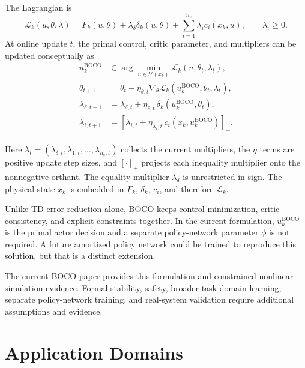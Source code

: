 \documentclass[a4paper]{article}
\begin{document}
The Lagrangian is
\begin{equation}
  \mathcal L_k(u,\theta,\lambda)
  =
  F_k(u,\theta)
  +
  \lambda_\delta\delta_k(u,\theta)
  +
  \sum_{i=1}^{n_c}\lambda_i c_i(x_k,u),
  \qquad
  \lambda_i\ge 0.
\end{equation}
At online update $t$, the primal control, critic parameter, and multipliers
can be updated conceptually as
\begin{equation}
  \begin{aligned}
    u_k^{\mathrm{BOCO}}
    &\in
    \arg\min_{u\in\mathcal U(x_k)}
    \mathcal L_k(u,\theta_t,\lambda_t),\\
    \theta_{t+1}
    &=
    \theta_t-\eta_{\theta,t}
    \nabla_\theta\mathcal L_k
    \!\left(u_k^{\mathrm{BOCO}},\theta_t,\lambda_t\right),\\
    \lambda_{\delta,t+1}
    &=
    \lambda_{\delta,t}
    +
    \eta_{\delta,t}\,
    \delta_k\!\left(u_k^{\mathrm{BOCO}},\theta_t\right),\\
    \lambda_{i,t+1}
    &=
    \left[
    \lambda_{i,t}
    +
    \eta_{\lambda_i,t}\,
    c_i\!\left(x_k,u_k^{\mathrm{BOCO}}\right)
    \right]_+ .
  \end{aligned}
\end{equation}

Here $\lambda_t=(\lambda_{\delta,t},\lambda_{1,t},\ldots,\lambda_{n_c,t})$
collects the current multipliers, the $\eta$ terms are positive update step
sizes, and $[\cdot]_+$ projects each inequality multiplier onto the
nonnegative orthant. The equality multiplier $\lambda_\delta$ is unrestricted
in sign. The physical state $x_k$ is embedded in $F_k$, $\delta_k$, $c_i$, and
therefore $\mathcal L_k$.

Unlike TD-error reduction alone, BOCO keeps control minimization, critic
consistency, and explicit constraints together. In the current formulation,
$u_k^{\mathrm{BOCO}}$ is the primal actor decision and a separate
policy-network parameter $\phi$ is not required. A future amortized policy
network could be trained to reproduce this solution, but that is a distinct
extension.

The current BOCO paper provides this formulation and constrained nonlinear
simulation evidence. Formal stability, safety, broader task-domain learning,
separate policy-network training, and real-system validation require
additional assumptions and evidence.

\section{Application Domains}
\end{document}
